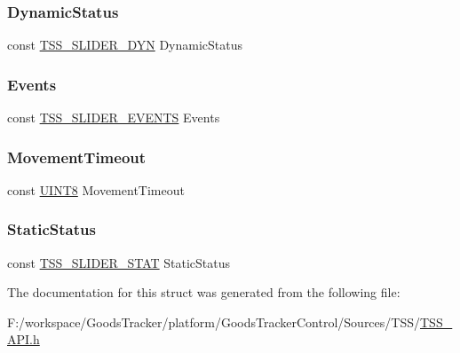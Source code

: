 \subsubsection{\texorpdfstring{Dynamic\+Status}{DynamicStatus}}
{\footnotesize\ttfamily const \hyperlink{struct_t_s_s___s_l_i_d_e_r___d_y_n}{T\+S\+S\+\_\+\+S\+L\+I\+D\+E\+R\+\_\+\+D\+YN} Dynamic\+Status}

\mbox{\label{struct_t_s_s___c_s_rotary_a6a67c9e8b9b2a0934ae230baff75b66b}} 
\subsubsection{\texorpdfstring{Events}{Events}}
{\footnotesize\ttfamily const \hyperlink{struct_t_s_s___s_l_i_d_e_r___e_v_e_n_t_s}{T\+S\+S\+\_\+\+S\+L\+I\+D\+E\+R\+\_\+\+E\+V\+E\+N\+TS} Events}

\mbox{\label{struct_t_s_s___c_s_rotary_ad3e98b5d97454837cd6293b7abffbe9f}} 
\subsubsection{\texorpdfstring{Movement\+Timeout}{MovementTimeout}}
{\footnotesize\ttfamily const \hyperlink{_t_s_s___data_types_8h_ab27e9918b538ce9d8ca692479b375b6a}{U\+I\+N\+T8} Movement\+Timeout}

\mbox{\label{struct_t_s_s___c_s_rotary_a095e6eb920491a2526b8678a3d6f7124}} 
\subsubsection{\texorpdfstring{Static\+Status}{StaticStatus}}
{\footnotesize\ttfamily const \hyperlink{struct_t_s_s___s_l_i_d_e_r___s_t_a_t}{T\+S\+S\+\_\+\+S\+L\+I\+D\+E\+R\+\_\+\+S\+T\+AT} Static\+Status}



The documentation for this struct was generated from the following file\+:\begin{DoxyCompactItemize}
\item 
F\+:/workspace/\+Goods\+Tracker/platform/\+Goods\+Tracker\+Control/\+Sources/\+T\+S\+S/\hyperlink{_t_s_s___a_p_i_8h}{T\+S\+S\+\_\+\+A\+P\+I.\+h}\end{DoxyCompactItemize}

